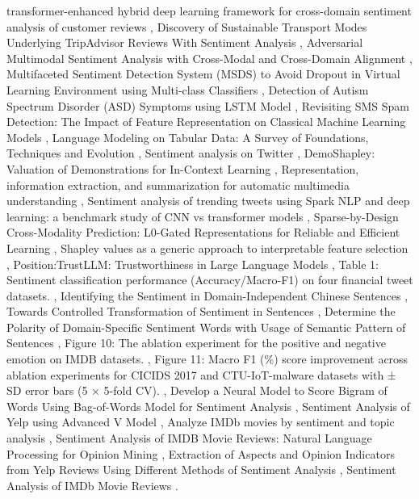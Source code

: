 \documentclass{article}
\begin{document}
transformer-enhanced hybrid deep learning framework for cross-domain sentiment analysis of customer reviews \cite{kumar2025sentxformere1166f91}, Discovery of Sustainable Transport Modes Underlying TripAdvisor Reviews With Sentiment Analysis \cite{serna2022discovery2f5ae476}, Adversarial Multimodal Sentiment Analysis with Cross-Modal and Cross-Domain Alignment \cite{golagana2025adversariala98f84f6}, Multifaceted Sentiment Detection System (MSDS) to Avoid Dropout in Virtual Learning Environment using Multi-class Classifiers \cite{t2023multifaceted30921198}, Detection of Autism Spectrum Disorder (ASD) Symptoms using LSTM Model \cite{mukherjee2024detection1f9cc3ec}, Revisiting SMS Spam Detection: The Impact of Feature Representation on Classical Machine Learning Models \cite{soysald2026revisiting0c8a8c5a}, Language Modeling on Tabular Data: A Survey of Foundations, Techniques and Evolution \cite{ruan2024languageed4af37b}, Sentiment analysis on Twitter \cite{proscia2017sentiment7ae0491a}, DemoShapley: Valuation of Demonstrations for In-Context Learning \cite{xie2024demoshapley0eb98bc5}, Representation, information extraction, and summarization for automatic multimedia understanding \cite{harrando2022representation75f8b324}, Sentiment analysis of trending tweets using Spark NLP and deep learning: a benchmark study of CNN vs transformer models \cite{benyamani2026sentiment9b767c99}, Sparse-by-Design Cross-Modality Prediction: L0-Gated Representations for Reliable and Efficient Learning \cite{cenacchi2026sparsebydesign83f7d32c}, Shapley values as a generic approach to interpretable feature selection \cite{trotskii2023shapley828133b0}, Position:TrustLLM: Trustworthiness in Large Language Models \cite{yue2024positionfd8c4283}, Table 1: Sentiment classification performance (Accuracy/Macro-F1) on four financial tweet datasets. \cite{paperndtable3751644a}, Identifying the Sentiment in Domain-Independent Chinese Sentences \cite{si2011identifying6d01276f}, Towards Controlled Transformation of Sentiment in Sentences \cite{leeftink2019towards27160a6c}, Determine the Polarity of Domain-Specific Sentiment Words with Usage of Semantic Pattern of Sentences \cite{yang2013determine6d69c868}, Figure 10: The ablation experiment for the positive and negative emotion on IMDB datasets. \cite{paperndfigure6b82e845}, Figure 11: Macro F1 (\%) score improvement across ablation experiments for CICIDS 2017 and CTU-IoT-malware datasets with ± SD error bars (5 × 5-fold CV). \cite{paperndfigure49caf9ce}, Develop a Neural Model to Score Bigram of Words Using Bag-of-Words Model for Sentiment Analysis \cite{balamurali2022develop3ea66269}, Sentiment Analysis of Yelp using Advanced V Model \cite{shaout2019sentiment15df16e4}, Analyze IMDb movies by sentiment and topic analysis \cite{ouyang2023analyze6d51f5aa}, Sentiment Analysis of IMDB Movie Reviews: Natural Language Processing for Opinion Mining \cite{paper2026sentiment19dab9d7}, Extraction of Aspects and Opinion Indicators from Yelp Reviews Using Different Methods of Sentiment Analysis \cite{bizel2020extraction580394cd}, Sentiment Analysis of IMDb Movie Reviews \cite{ajmera2022sentiment9a5a9e51}.
\end{document}
